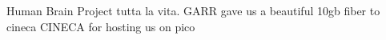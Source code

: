 \documentclass[12pt]{spieman}  %
\begin{document}

\acknowledgments 
Human Brain Project tutta la vita. 
GARR gave us a beautiful 10gb fiber to cineca
CINECA for hosting us on pico

\end{document}
